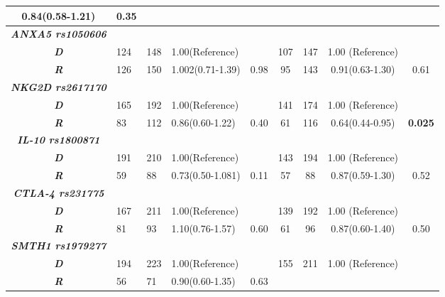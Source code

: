 \documentclass[journal,article,submit,moreauthors,pdftex]{Definitions/mdpi}
\begin{document}
\begin{table}[H]
{\begin{tabular}{clllccccl}
  0.84(0.58-1.21) &
  \multicolumn{1}{c}{0.35} \\ \hline
\textit{\textbf{ANXA5 rs1050606}} &
   &
   &
   &
   &
  \multicolumn{1}{l}{} &
  \multicolumn{1}{l}{} &
  \multicolumn{1}{l}{} &
   \\ \hline
\textit{\textbf{D}} &
  124 &
  148 &
  1.00(Reference) &
   &
  107 &
  147 &
  \multicolumn{1}{l}{1.00 (Reference)} &
   \\ \hline
\textit{\textbf{R}} &
  126 &
  150 &
  1.002(0.71-1.39) &
  0.98 &
  95 &
  143 &
  0.91(0.63-1.30) &
  \multicolumn{1}{c}{0.61} \\ \hline
\textit{\textbf{NKG2D rs2617170}} &
   &
   &
   &
   &
  \multicolumn{1}{l}{} &
  \multicolumn{1}{l}{} &
  \multicolumn{1}{l}{} &
   \\ \hline
\textit{\textbf{D}} &
  165 &
  192 &
  1.00(Reference) &
   &
  141 &
  174 &
  \multicolumn{1}{l}{1.00 (Reference)} &
   \\ \hline
\textit{\textbf{R}} &
  83 &
  112 &
  0.86(0.60-1.22) &
  0.40 &
  61 &
  116 &
  0.64(0.44-0.95) &
  \multicolumn{1}{c}{\textbf{0.025}} \\ \hline
\textit{\textbf{IL-10 rs1800871}} &
   &
   &
   &
   &
  \multicolumn{1}{l}{} &
  \multicolumn{1}{l}{} &
  \multicolumn{1}{l}{} &
   \\ \hline
\textit{\textbf{D}} &
  191 &
  210 &
  1.00(Reference) &
   &
  143 &
  194 &
  1.00 (Reference) &
   \\ \hline
\textit{\textbf{R}} &
  59 &
  88 &
  0.73(0.50-1.081) &
  0.11 &
  57 &
  88 &
  0.87(0.59-1.30) &
  \multicolumn{1}{c}{0.52} \\ \hline
\textit{\textbf{CTLA-4 rs231775}} &
   &
   &
   &
  \multicolumn{1}{l}{} &
  \multicolumn{1}{l}{} &
  \multicolumn{1}{l}{} &
  \multicolumn{1}{l}{} &
   \\ \hline
\textit{\textbf{D}} &
  167 &
  211 &
  1.00(Reference) &
   &
  139 &
  192 &
  \multicolumn{1}{l}{1.00 (Reference)} &
   \\ \hline
\textit{\textbf{R}} &
  81 &
  93 &
  1.10(0.76-1.57) &
  0.60 &
  61 &
  96 &
  0.87(0.60-1.40) &
  \multicolumn{1}{c}{0.50} \\ \hline
\textit{\textbf{SMTH1 rs1979277}} &
   &
   &
   &
   &
   &
   &
  \multicolumn{1}{l}{} &
   \\ \hline
\textit{\textbf{D}} &
  194 &
  223 &
  1.00(Reference) &
   &
  155 &
  211 &
  1.00 (Reference) &
   \\ \hline
\textit{\textbf{R}} &
  56 &
  71 &
  0.90(0.60-1.35) &
  0.63 &

\end{tabular}}
\end{table}
\end{document}
